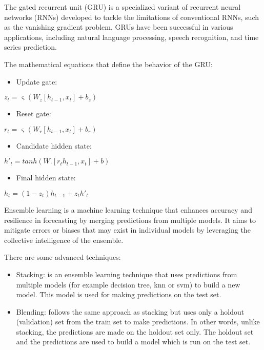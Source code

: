 \documentclass{ieeeojies}
\begin{document}
The gated recurrent unit (GRU) is a specialized variant of recurrent neural networks (RNNs) developed to tackle the limitations of conventional RNNs, such as the vanishing gradient problem. GRUs have been successful in various applications, including natural language processing, speech recognition, and time series prediction. \cite{r9}

The mathematical equations that define the behavior of the GRU:
\begin{itemize}
    \item Update gate:
\end{itemize}
\begin{center}
    \(z_t = \upvarsigma(W_z[h_{t-1}, x_t] + b_z)\)
\end{center}
\begin{itemize}
    \item Reset gate:
\end{itemize}
\begin{center}
    \(r_t = \upvarsigma(W_r[h_{t-1}, x_t] + b_r)\)
\end{center}

\begin{itemize}
    \item Candidate hidden state:
\end{itemize}
\begin{center}
    \(h'_t = tanh(W.[r_th_{t-1},x_t] + b)\)
\end{center}
\begin{itemize}
    \item Final hidden state:
\end{itemize}
\begin{center}
    \(h_t = (1-z_t)h_{t-1} + z_th'_t \)
\end{center}

Ensemble learning is a machine learning technique that enhances accuracy and resilience in forecasting by merging predictions from multiple models. It aims to mitigate errors or biases that may exist in individual models by leveraging the collective intelligence of the ensemble. \cite{r10}

There are some advanced techniques:
\begin{itemize}
    \item Stacking: is an ensemble learning technique that uses predictions from multiple models (for example decision tree, knn or svm) to build a new model. This model is used for making predictions on the test set.
\end{itemize}
\begin{itemize}
    \item Blending: follows the same approach as stacking but uses only a holdout (validation) set from the train set to make predictions. In other words, unlike stacking, the predictions are made on the holdout set only. The holdout set and the predictions are used to build a model which is run on the test set.
\end{itemize}
\end{document}
